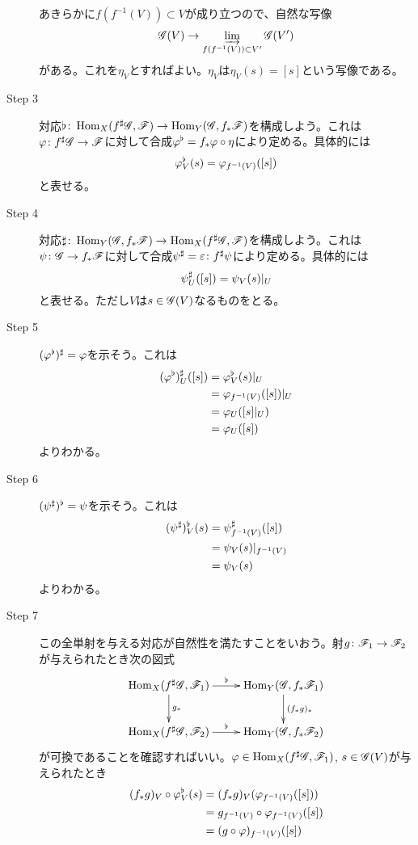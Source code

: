 \begin{description}
  あきらかに$f(f^{-1}(V)) \subset V$が成り立つので、自然な写像
  \[
  \mathscr{G}(V) \to \operatorname*{\varinjlim}_{f(f^{-1}(V)) \subset V' } \mathscr{G}(V')
  \]
  がある。これを$\eta_V$とすればよい。$\eta_V$は$\eta_V(s) = [s] $という写像である。
  \item[Step 3] 対応$\flat \colon \operatorname{Hom}_X(f^{\sharp}\mathscr{G} , \mathscr{F}) \to \operatorname{Hom}_Y(\mathscr{G} , f_*\mathscr{F})$を構成しよう。これは${\varphi} \colon f^{\sharp}\mathscr{G} \to \mathscr{F}$に対して合成${\varphi}^{\flat} = f_* {\varphi} \circ \eta$により定める。具体的には
  \[
  {\varphi}^{\flat}_V (s) = {\varphi}_{f^{-1}(V)} ([s])
  \]
  と表せる。
  \item[Step 4] 対応$\sharp \colon \operatorname{Hom}_Y(\mathscr{G} , f_*\mathscr{F}) \to \operatorname{Hom}_X(f^{\sharp}\mathscr{G} , \mathscr{F})$を構成しよう。これは$\psi \colon \mathscr{G} \to f_* \mathscr{F}$に対して合成$\psi^{\sharp} = {\varepsilon} \colon f^{\sharp} \psi$により定める。具体的には
  \[
  \psi^{\sharp}_U([s]) = \psi_V(s) |_U
  \]
  と表せる。ただし$V$は$s \in \mathscr{G}(V)$なるものをとる。
  \item[Step 5] $({\varphi}^{\flat})^{\sharp} = {\varphi}$を示そう。これは
  \begin{align*}
    ({\varphi}^{\flat})^{\sharp}_U([s]) &= {\varphi}^{\flat}_V (s) |_U \\
    &= {\varphi}_{f^{-1}(V)} ([s]) |_U \\
    &= {\varphi}_U ( [s] |_U  ) \\
    &= {\varphi}_U([s])
  \end{align*}
  よりわかる。
  \item[Step 6] $(\psi^{\sharp})^{\flat} = \psi$を示そう。これは
  \begin{align*}
    (\psi^{\sharp})^{\flat}_V(s) &= \psi^{\sharp}_{f^{-1}(V)}([s]) \\
    &= \psi_V(s)|_{f^{-1}(V)} \\
    &= \psi_V(s)
  \end{align*}
  よりわかる。
  \item[Step 7] この全単射を与える対応が自然性を満たすことをいおう。射$g \colon \mathscr{F}_1 \to \mathscr{F}_2$が与えられたとき次の図式
  \[
  \xymatrix{
  \Hom_X(f^{\sh}\scrg, \scrf_1) \ar[r]^-{\fl} \ar[d]^-{g_*} & \Hom_Y(\scrg,f_*\scrf_1) \ar[d]^-{(f_*g)_*} \\
  \Hom_X(f^{\sh}\scrg, \scrf_2) \ar[r]^-{\fl} & \Hom_Y(\scrg,f_*\scrf_2)
  }
  \]
  が可換であることを確認すればいい。${\varphi} \in \operatorname{Hom}_X(f^{\sharp}\mathscr{G}, \mathscr{F}_1)$, $s \in \mathscr{G}(V)$が与えられたとき
  \begin{align*}
    (f_* g)_V \circ \vp^{\fl}_V(s) &= (f_*g)_V ( \vp_{f^{-1}(V)}([s]) ) \\
    &= g_{f^{-1}(V)} \circ \vp_{f^{-1}(V)} ([s]) \\
    &= (g \circ \vp)_{ f^{-1}(V)} ([s]) \\

\end{align*}
\end{description}
